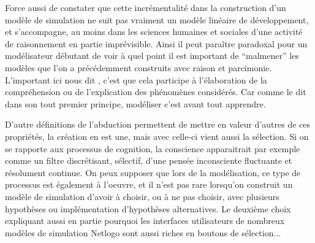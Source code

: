Force aussi de constater que cette incrémentalité dans la construction d'un modèle de simulation ne suit pas vraiment un modèle linéaire de développement, et s'accompagne, au moins dans les sciences humaines et sociales d'une activité de raisonnement en partie imprévisible. Ainsi il peut paraître paradoxal pour un modélisateur débutant de voir à quel point il est important de \enquote{malmener} les modèles que l'on a précédemment construits avec raison et parcimonie. L'important ici nous dit \textcite{Amblard2010}, c'est que cela participe à l'élaboration de la compréhension ou de l'explication des phénomènes considérés. Car comme le dit \textcite[65]{Banos2013} dans son tout premier principe, modéliser c'est avant tout apprendre.

D'autre définitions de l'abduction  permettent de mettre en valeur d'autres de ces propriétés, la création en est une, mais avec celle-ci vient aussi la sélection. Si on se rapporte aux processus de cognition, la conscience apparaitrait par exemple comme un filtre discrétisant, sélectif, d'une pensée inconsciente fluctuante et résolument continue. On peux supposer que lors de la modélisation, ce type de processus est également à l'oeuvre, et il n'est pas rare lorsqu'on construit un modèle de simulation d'avoir à choisir, ou à ne pas choisir, avec plusieurs hypothèses ou implémentation d'hypothèses alternatives. Le deuxième choix expliquant aussi en partie pourquoi les interfaces utilisateurs de nombreux modèles de simulation Netlogo sont aussi riches en boutons de sélection...



